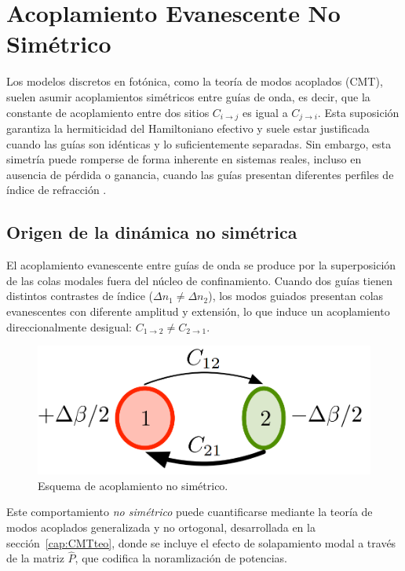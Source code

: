\chapter{Acoplamiento Evanescente No Simétrico}
\label{cap:asymmetric}

Los modelos discretos en fotónica, como la teoría de modos acoplados (CMT), suelen asumir acoplamientos simétricos entre guías de onda, es decir, que la constante de acoplamiento entre dos sitios \( C_{i \to j} \) es igual a \( C_{j \to i} \). Esta suposición garantiza la hermiticidad del Hamiltoniano efectivo y suele estar justificada cuando las guías son idénticas y lo suficientemente separadas. Sin embargo, esta simetría puede romperse de forma inherente en sistemas reales, incluso en ausencia de pérdida o ganancia, cuando las guías presentan diferentes perfiles de índice de refracción \cite{nonsymm}.

\section{Origen de la dinámica no simétrica}

El acoplamiento evanescente entre guías de onda se produce por la superposición de las colas modales fuera del núcleo de confinamiento. Cuando dos guías tienen distintos contrastes de índice (\( \Delta n_1 \ne \Delta n_2 \)), los modos guiados presentan colas evanescentes con diferente amplitud y extensión, lo que induce un acoplamiento direccionalmente desigual: \( C_{1 \to 2} \ne C_{2 \to 1} \).
\begin{figure}[H]
	\centering
	\includegraphics[width=0.4\linewidth]{media/nonsympaper}
	\caption{Esquema de acoplamiento no simétrico.}
\end{figure}
Este comportamiento \textit{no simétrico} puede cuantificarse mediante la teoría de modos acoplados generalizada y no ortogonal, desarrollada en la sección~\ref{cap:CMTteo}, donde se incluye el efecto de solapamiento modal a través de la matriz \( \hat{P} \), que codifica la noramlización de potencias.

